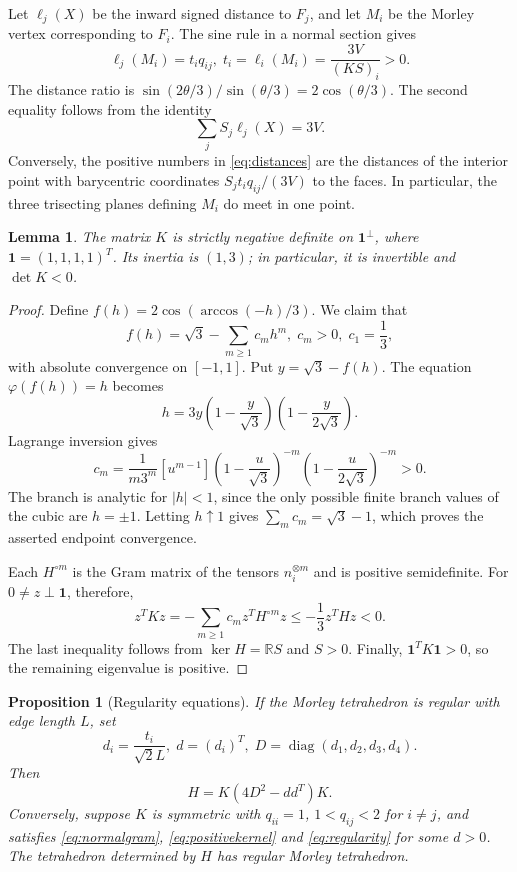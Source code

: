 \documentclass[11pt]{article}
\newtheorem{proposition}[theorem]{Proposition}
\newtheorem{lemma}[theorem]{Lemma}
\theoremstyle{definition}
\theoremstyle{remark}
\DeclareMathOperator{\diag}{diag}
\newcommand{\R}{\mathbb{R}}
\newcommand{\one}{\mathbf 1}
\newcommand{\ph}{\varphi}
\begin{document}
Let $\ell_j(X)$ be the inward signed distance to $F_j$, and let $M_i$ be the Morley vertex corresponding to $F_i$. The sine rule in a normal section gives
\begin{equation}
\ell_j(M_i)=t_iq_{ij},\;
t_i=\ell_i(M_i)=\frac{3V}{(KS)_i}>0.
\label{eq:distances}
\end{equation}
The distance ratio is $\sin(2\theta/3)/\sin(\theta/3)=2\cos(\theta/3)$. The second equality follows from the identity
\[
\sum_j S_j\ell_j(X)=3V.
\]
Conversely, the positive numbers in \eqref{eq:distances} are the distances of the interior point with barycentric coordinates $S_jt_iq_{ij}/(3V)$ to the faces. In particular, the three trisecting planes defining $M_i$ do meet in one point.

\begin{lemma}
\label{lem:negative}
The matrix $K$ is strictly negative definite on $\one^\perp$, where $\one=(1,1,1,1)^T$. Its inertia is $(1,3)$; in particular, it is invertible and $\det K<0$.
\end{lemma}

\begin{proof}
Define $f(h)=2\cos(\arccos(-h)/3)$. We claim that
\[
f(h)=\sqrt3-\sum_{m\ge1}c_mh^m,\;
c_m>0,\; c_1=\frac13,
\]
with absolute convergence on $[-1,1]$. Put $y=\sqrt3-f(h)$. The equation $\ph(f(h))=h$ becomes
\[
h=3y\left(1-\frac{y}{\sqrt3}\right)
       \left(1-\frac{y}{2\sqrt3}\right).
\]
Lagrange inversion gives
\[
c_m=\frac{1}{m3^m}[u^{m-1}]
\left(1-\frac{u}{\sqrt3}\right)^{-m}
\left(1-\frac{u}{2\sqrt3}\right)^{-m}>0.
\]
The branch is analytic for $|h|<1$, since the only possible finite branch values of the cubic are $h=\pm1$. Letting $h\uparrow1$ gives $\sum_m c_m=\sqrt3-1$, which proves the asserted endpoint convergence.

Each $H^{\circ m}$ is the Gram matrix of the tensors $n_i^{\otimes m}$ and is positive semidefinite. For $0\ne z\perp\one$, therefore,
\[
z^TKz=-\sum_{m\ge1}c_mz^TH^{\circ m}z
\le-\frac13z^THz<0.
\]
The last inequality follows from $\ker H=\R S$ and $S>0$. Finally, $\one^TK\one>0$, so the remaining eigenvalue is positive.
\end{proof}

\begin{proposition}[Regularity equations]
\label{prop:regularity}
If the Morley tetrahedron is regular with edge length $L$, set
\[
d_i=\frac{t_i}{\sqrt2L},\; d=(d_i)^T,
\; D=\diag(d_1,d_2,d_3,d_4).
\]
Then
\begin{equation}
H=K(4D^2-dd^T)K.
\label{eq:regularity}
\end{equation}
Conversely, suppose $K$ is symmetric with $q_{ii}=1$, $1<q_{ij}<2$ for $i\ne j$, and satisfies \eqref{eq:normalgram}, \eqref{eq:positivekernel} and \eqref{eq:regularity} for some $d>0$. The tetrahedron determined by $H$ has regular Morley tetrahedron.
\end{proposition}
\end{document}
